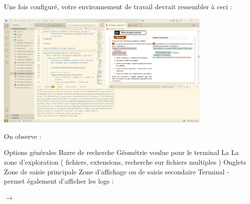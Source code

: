 \begin{Exemple}

    Une fois configuré, votre environnement de travail devrait ressembler à ceci : 

    \begin{center}
        \includegraphics[width=0.8\textwidth]{images/IDE/VSCode_use.png}
    \end{center}

    On observe : 
    \begin{tcbenumerate}[2]
        \tcbitem Options générales
        \tcbitem Barre de recherche
        \tcbitem Géométrie voulue pour le terminal
        \tcbitem La 
        \tcbitem La zone d'exploration ( fichiers, extensions, recherche sur fichiers multiples )
        \tcbitem Onglets
        \tcbitem Zone de saisie principale
        \tcbitem Zone d'affichage ou de saisie secondaire
        \tcbitem Terminal - permet également d'afficher les logs : 

        $\rightarrow$
    \end{tcbenumerate}
\end{Exemple}